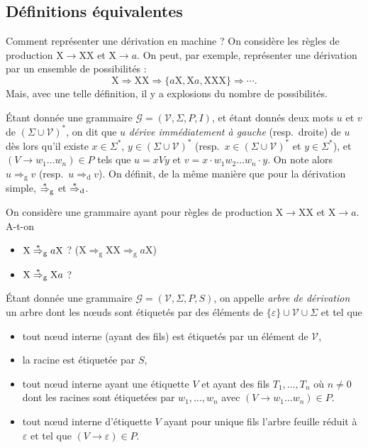\subsection{Définitions équivalentes}

Comment représenter une dérivation en machine ? On considère les règles de production $\mathrm{X} \to \mathrm{XX}$ et $\mathrm{X} \to a$. On peut, par exemple, représenter une dérivation par un ensemble de possibilités : \[
	\mathrm{X} \Rightarrow \mathrm{XX} \Rightarrow \{a \mathrm{X}, \mathrm{X} a, \mathrm{XXX}\} \Rightarrow \cdots
.\]Mais, avec une telle définition, il y a explosions du nombre de possibilités.

\begin{defn}
	Étant donnée une grammaire $\mathcal{G} = (\mathcal{V}, \Sigma, P, I)$, et étant donnés deux mots $u$ et $v$ de $(\Sigma \cup \mathcal{V})^*$, on dit que $u$ \textit{dérive immédiatement à gauche} (resp.\ droite) de $u$ dès lors qu'il existe $x \in \Sigma^*$, $y \in (\Sigma \cup \mathcal{V})^*$ (resp.\ $x \in (\Sigma \cup \mathcal{V})^*$ et $y \in \Sigma^*$), et $(V \to w_1\ldots w_n) \in P$ tels que $u = x V y$ et $v = x \cdot w_1 w_2 \ldots w_n \cdot y$.
	On note alors $u \Rightarrow_\mathrm{g} v$ (resp.\ $u \Rightarrow_\mathrm{d} v$).
	On définit, de la même manière que pour la dérivation simple, $\mathrel{\overset*\Rightarrow} _\mathrm{g}$ et $\mathrel{\overset*\Rightarrow} _\mathrm{d}$.
\end{defn}

\begin{exm}
	On considère une grammaire ayant pour règles de production $\mathrm{X} \to \mathrm{XX}$ et $\mathrm{X} \to a$.
	A-t-on
	\begin{itemize}
		\item $\mathrm{X} \mathrel{\overset*\Rightarrow} _\mathrm{g} a \mathrm{X}$ ? \quad\quad\gtk \quad\quad\quad\quad\quad ($\mathrm{X} \Rightarrow_\mathrm{g} \mathrm{XX} \Rightarrow_\mathrm{g} a \mathrm{X}$)
		\item $\mathrm{X} \mathrel{\overset*\Rightarrow} _\mathrm{g} \mathrm{X} a$ ? \quad\quad\rcs
	\end{itemize}
\end{exm}

\begin{defn}
	Étant donnée une grammaire $\mathcal{G} = (\mathcal{V}, \Sigma, P, S)$, on appelle \textit{arbre de dérivation} un arbre dont les nœuds sont étiquetés par des éléments de $\{\varepsilon\} \cup \mathcal{V} \cup \Sigma$ et tel que
	\begin{itemize}
		\item tout nœud interne (ayant des fils) est étiquetés par un élément de $\mathcal{V}$,
		\item la racine est étiquetée par $S$,
		\item tout nœud interne ayant une étiquette $V$ et ayant des fils $T_1, \ldots, T_n$ où $n \neq 0$ dont les racines sont étiquetées par $w_1, \ldots, w_n$ avec $(V \to w_1 \ldots w_n) \in P$.
		\item tout nœud interne d'étiquette $V$ ayant pour unique fils l'arbre feuille réduit à $\varepsilon$ et tel que $(V \to \varepsilon) \in P$.
	\end{itemize}
\end{defn}


